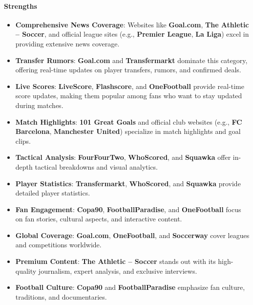 \paragraph{Strengths}
\begin{itemize}
    \item \textbf{Comprehensive News Coverage}: Websites like \textbf{Goal.com}, \textbf{The Athletic – Soccer}, and official league sites (e.g., \textbf{Premier League}, \textbf{La Liga}) excel in providing extensive news coverage.
    \item \textbf{Transfer Rumors}: \textbf{Goal.com} and \textbf{Transfermarkt} dominate this category, offering real-time updates on player transfers, rumors, and confirmed deals.
    \item \textbf{Live Scores}: \textbf{LiveScore}, \textbf{Flashscore}, and \textbf{OneFootball} provide real-time score updates, making them popular among fans who want to stay updated during matches.
    \item \textbf{Match Highlights}: \textbf{101 Great Goals} and official club websites (e.g., \textbf{FC Barcelona}, \textbf{Manchester United}) specialize in match highlights and goal clips.
    \item \textbf{Tactical Analysis}: \textbf{FourFourTwo}, \textbf{WhoScored}, and \textbf{Squawka} offer in-depth tactical breakdowns and visual analytics.
    \item \textbf{Player Statistics}: \textbf{Transfermarkt}, \textbf{WhoScored}, and \textbf{Squawka} provide detailed player statistics.
    \item \textbf{Fan Engagement}: \textbf{Copa90}, \textbf{FootballParadise}, and \textbf{OneFootball} focus on fan stories, cultural aspects, and interactive content.
    \item \textbf{Global Coverage}: \textbf{Goal.com}, \textbf{OneFootball}, and \textbf{Soccerway} cover leagues and competitions worldwide.
    \item \textbf{Premium Content}: \textbf{The Athletic – Soccer} stands out with its high-quality journalism, expert analysis, and exclusive interviews.
    \item \textbf{Football Culture}: \textbf{Copa90} and \textbf{FootballParadise} emphasize fan culture, traditions, and documentaries.
\end{itemize}

